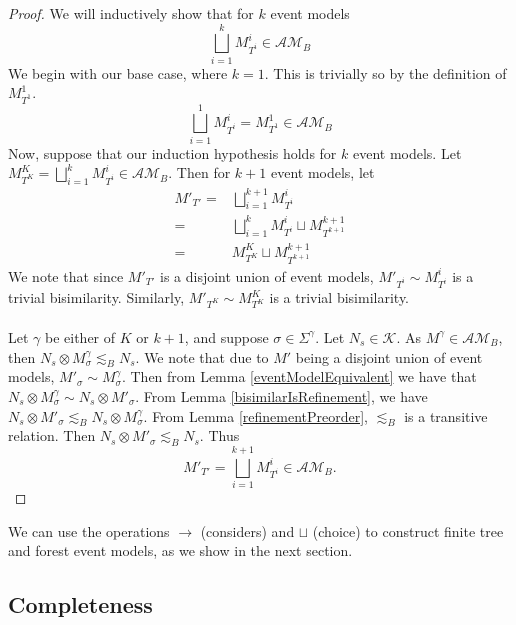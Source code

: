 \documentclass[12pt, a4paper, titlepage]{article}
\numberwithin{equation}{section}
\newcommand{\kripkeClass}{\mathcal{K}}
\newcommand{\eventClass}{\mathcal{AM}}
\begin{document}
\begin{proof}
We will inductively show that for $k$ event models
\[
	\bigsqcup_{i = 1}^k M^i_{T^i} \in \eventClass_B
\]
We begin with our base case, where $k = 1$.
This is trivially so by the definition of $M^1_{T^1}$.
\[
	\bigsqcup_{i = 1}^1 M^i_{T^i} = M^1_{T^1} \in \eventClass_B
\]
Now, suppose that our induction hypothesis holds for $k$ event models.
Let $M^K_{T^K} = \bigsqcup_{i = 1}^k M^i_{T^i} \in \eventClass_B$.
Then for $k+1$ event models, let
\begin{align*}
	M'_{T'} = & \bigsqcup_{i = 1}^{k+1} M^i_{T^i} \\
	= & \bigsqcup_{i = 1}^k M^i_{T^i} \sqcup M^{k+1}_{T^{k+1}} \\
	= & M^K_{T^K} \sqcup M^{k+1}_{T^{k+1}}
\end{align*}
We note that since $M'_{T'}$ is a disjoint union of event models, $M'_{T^i} \sim M^i_{T^i}$ is a
trivial bisimilarity.
Similarly, $M'_{T^K} \sim M^K_{T^K}$ is a trivial bisimilarity.\\
\\
Let $\gamma$ be either of $K$ or $k+1$, and suppose $\sigma \in \Sigma^\gamma$.
Let $N_s \in \kripkeClass$.
As $M^\gamma \in \eventClass_B$, then $N_s \otimes M^\gamma_\sigma \lesssim_B N_s$.
We note that due to $M'$ being a disjoint union of event models, $M'_\sigma \sim M^\gamma_\sigma$.
Then from Lemma \ref{eventModelEquivalent} we have that $N_s \otimes M^\gamma_\sigma \sim N_s
\otimes M'_\sigma$.
From Lemma \ref{bisimilarIsRefinement}, we have $N_s \otimes M'_\sigma \lesssim_B N_s \otimes M^\gamma_\sigma$.
From Lemma \ref{refinementPreorder}, $\lesssim_B$ is a transitive relation.
Then $N_s \otimes M'_\sigma \lesssim_B N_s$.
Thus
\[
M'_{T'} = \bigsqcup_{i = 1}^{k+1} M^i_{T^i} \in \eventClass_B.
\]
\end{proof}

We can use the operations $\to$ (considers) and $\sqcup$ (choice) to construct finite tree and
forest event models, as we show in the next section.

\subsection{Completeness}
\end{document}
